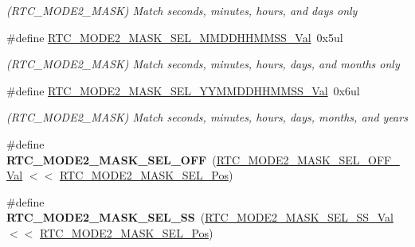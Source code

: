 \begin{DoxyCompactItemize}
\begin{DoxyCompactList}\small\item\em (R\+T\+C\+\_\+\+M\+O\+D\+E2\+\_\+\+M\+A\+S\+K) Match seconds, minutes, hours, and days only \end{DoxyCompactList}\item 
\hypertarget{group___s_a_m_l21___r_t_c_ga87227ed0c01ed7e75c49d0b6bb6ff1e8}{}\#define \hyperlink{group___s_a_m_l21___r_t_c_ga87227ed0c01ed7e75c49d0b6bb6ff1e8}{R\+T\+C\+\_\+\+M\+O\+D\+E2\+\_\+\+M\+A\+S\+K\+\_\+\+S\+E\+L\+\_\+\+M\+M\+D\+D\+H\+H\+M\+M\+S\+S\+\_\+\+Val}~0x5ul\label{group___s_a_m_l21___r_t_c_ga87227ed0c01ed7e75c49d0b6bb6ff1e8}

\begin{DoxyCompactList}\small\item\em (R\+T\+C\+\_\+\+M\+O\+D\+E2\+\_\+\+M\+A\+S\+K) Match seconds, minutes, hours, days, and months only \end{DoxyCompactList}\item 
\hypertarget{group___s_a_m_l21___r_t_c_ga68bd000f6eaf45dc8fedd848b9ff2a2b}{}\#define \hyperlink{group___s_a_m_l21___r_t_c_ga68bd000f6eaf45dc8fedd848b9ff2a2b}{R\+T\+C\+\_\+\+M\+O\+D\+E2\+\_\+\+M\+A\+S\+K\+\_\+\+S\+E\+L\+\_\+\+Y\+Y\+M\+M\+D\+D\+H\+H\+M\+M\+S\+S\+\_\+\+Val}~0x6ul\label{group___s_a_m_l21___r_t_c_ga68bd000f6eaf45dc8fedd848b9ff2a2b}

\begin{DoxyCompactList}\small\item\em (R\+T\+C\+\_\+\+M\+O\+D\+E2\+\_\+\+M\+A\+S\+K) Match seconds, minutes, hours, days, months, and years \end{DoxyCompactList}\item 
\hypertarget{group___s_a_m_l21___r_t_c_ga83cefe6f2fcd5352e1452e4b4506761c}{}\#define {\bfseries R\+T\+C\+\_\+\+M\+O\+D\+E2\+\_\+\+M\+A\+S\+K\+\_\+\+S\+E\+L\+\_\+\+O\+F\+F}~(\hyperlink{group___s_a_m_l21___r_t_c_ga207406f608156bb1d464023f3348deba}{R\+T\+C\+\_\+\+M\+O\+D\+E2\+\_\+\+M\+A\+S\+K\+\_\+\+S\+E\+L\+\_\+\+O\+F\+F\+\_\+\+Val}    $<$$<$ \hyperlink{group___s_a_m_l21___r_t_c_ga34aaed36d41b5e7dad831c960d609d15}{R\+T\+C\+\_\+\+M\+O\+D\+E2\+\_\+\+M\+A\+S\+K\+\_\+\+S\+E\+L\+\_\+\+Pos})\label{group___s_a_m_l21___r_t_c_ga83cefe6f2fcd5352e1452e4b4506761c}

\item 
\hypertarget{group___s_a_m_l21___r_t_c_ga9e0a2d84323dfdc43e195434f9e8f04d}{}\#define {\bfseries R\+T\+C\+\_\+\+M\+O\+D\+E2\+\_\+\+M\+A\+S\+K\+\_\+\+S\+E\+L\+\_\+\+S\+S}~(\hyperlink{group___s_a_m_l21___r_t_c_gaf9fdace41ce544294152c18f4a54da24}{R\+T\+C\+\_\+\+M\+O\+D\+E2\+\_\+\+M\+A\+S\+K\+\_\+\+S\+E\+L\+\_\+\+S\+S\+\_\+\+Val}     $<$$<$ \hyperlink{group___s_a_m_l21___r_t_c_ga34aaed36d41b5e7dad831c960d609d15}{R\+T\+C\+\_\+\+M\+O\+D\+E2\+\_\+\+M\+A\+S\+K\+\_\+\+S\+E\+L\+\_\+\+Pos})\label{group___s_a_m_l21___r_t_c_ga9e0a2d84323dfdc43e195434f9e8f04d}


\end{DoxyCompactItemize}
